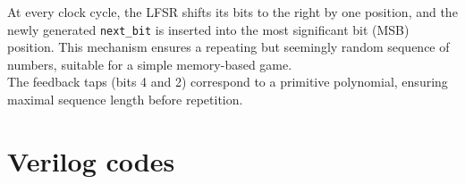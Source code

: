 \documentclass[10pt,a4paper,twocolumn,twoside]{tau-class/tau}
\begin{document}
    At every clock cycle, the LFSR shifts its bits to the right by one position, and the newly generated \texttt{next\_bit} is inserted into the most significant bit (MSB) position. This mechanism ensures a repeating but seemingly random sequence of numbers, suitable for a simple memory-based game.
    \\
    The feedback taps (bits 4 and 2) correspond to a primitive polynomial, ensuring maximal sequence length before repetition.

	
\section{Verilog codes}
	
    
	




\end{document}
